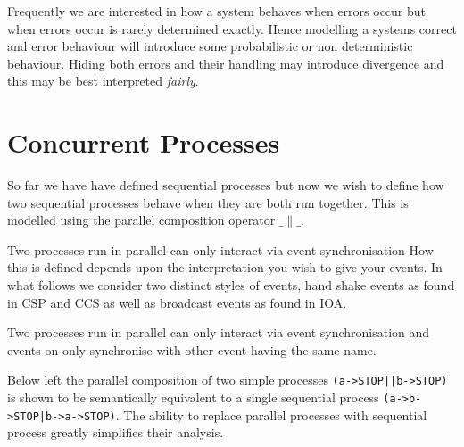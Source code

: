 \documentclass[]{article}
\begin{document}
Frequently we are interested in how a system behaves when errors occur but when errors occur is rarely determined exactly. Hence modelling a systems correct and error behaviour will introduce some probabilistic or non deterministic behaviour. Hiding both errors and their handling may introduce divergence and this may be best interpreted \emph{fairly}.


\section{Concurrent Processes }
So far we have have defined sequential processes but now we wish to define how two sequential processes behave when they are both run together. This is modelled using the parallel composition operator $\_\parallel\_$.


Two processes run in parallel can only interact via event synchronisation How this is defined depends upon the interpretation you wish to give your events. In what follows we consider two distinct styles of events, hand shake events as found in CSP and CCS as well as broadcast events as found in IOA.


Two processes run in parallel can only interact via event synchronisation and events on only synchronise with other event having the same name.

Below left  the parallel composition of two simple processes \verb!(a->STOP||b->STOP) ! is shown to be semantically equivalent to a single  sequential process \verb!(a->b->STOP|b->a->STOP)!. The ability to replace parallel processes with sequential process greatly simplifies their analysis.
\end{document}
